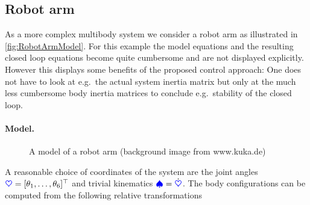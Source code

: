 \subsection{Robot arm}
As a more complex multibody system we consider a robot arm as illustrated in \autoref{fig:RobotArmModel}.
For this example the model equations and the resulting closed loop equations become quite cumbersome and are not displayed explicitly.
However this displays some benefits of the proposed control approach: One does not have to look at e.g.\ the actual system inertia matrix but only at the much less cumbersome body inertia matrices to conclude e.g.\ stability of the closed loop. 

\paragraph{Model.}
\begin{figure}
 \centering
 
 \caption{A model of a robot arm (background image from www.kuka.de)}
 \label{fig:RobotArmModel}
\end{figure}
A reasonable choice of coordinates of the system are the joint angles $\sysCoord = [\jointAngle[1], \ldots, \jointAngle[6]]^\top$ and trivial kinematics $\sysVel = \sysCoordd$.
The body configurations can be computed from the following relative transformations

